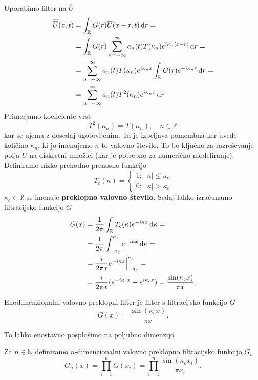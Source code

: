 \documentclass[mat2, tisk]{fmfdelo}
\newcommand{\R}{\mathbb R}
\newcommand{\N}{\mathbb N}
\newcommand{\Z}{\mathbb Z}
\begin{document}
\noindent
Uporabimo filter na $\overline{U}$
\begin{align*}
\overline{\overline{U}}(x, t) &= \int_\R G(r) \overline{U}(x-r, t) \dif r = \\
&= \int_\R G(r) \sum_{n=-\infty}^\infty a_n(t) T(\kappa_n) e^{i\kappa_n (x - r)} \dif r= \\
&= \sum_{n=-\infty}^\infty a_n(t)T(\kappa_n) e^{i\kappa_n x} \int_\R G(r)e^{-i\kappa_n r} \dif r = \\
&= \sum_{n=-\infty}^\infty a_n(t)T^2(\kappa_n) e^{i\kappa_n x} \dif r
\end{align*}
Primerjamo koeficiente vrst
$$
T^2(\kappa_n) = T(\kappa_n), \quad n\in \Z
$$
kar se ujema z dosedaj ugotovljenim. Ta je izpeljava pomembna ker uvede količino 
$\kappa_n$, ki jo imenujemo $n$-to valovno število. To bo ključno za razreševanje 
polja $\overline{U}$ na diskretni množici (kar je potrebno za numerično modeliranje).
Definiramo nizko-prehodno prenosno funkcijo
$$
T_c(\kappa)=\left\{\begin{array}{l}
  1 ;\,\, |\kappa| \leq \kappa_c \\
  0 ;\,\, |\kappa| > \kappa_c
\end{array}\right.
$$
$\kappa_c \in \R$ se imenuje \textbf{preklopno valovno število}. Sedaj lahko izračunamo 
filtracijsko funkcijo $G$
\begin{align*}
G(x) &= \frac{1}{2\pi} \int_\R T_c(\kappa) e^{-i\kappa x} \dif \kappa = \\
&= \frac{1}{2\pi} \int_{-\kappa_c}^{\kappa_c} e^{-i\kappa x} \dif \kappa = \\ 
&= \frac{i}{2\pi x} e^{-i\kappa x}\Big|_{-\kappa_c}^{\kappa_c} = \\
&= \frac{i}{2\pi x} (e^{-i\kappa_c x} - e^{i\kappa_c x}) = \frac{\sin(\kappa_c x)}{\pi x}.
\end{align*} 

\begin{definicija}
Enodimenzionalni valovno preklopni filter je filter s filtracijsko funkcijo $G$
\begin{equation}
G(x) = \frac{\sin(\kappa_c x)}{\pi x}.
\end{equation}
\end{definicija}
\noindent
To lahko enostavno posplošimo na poljubno dimenzijo 
\begin{definicija}
Za $n\in \N$ definiramo $n$-dimenzionalni valovno preklopno filtracijsko 
funkcijo $G_n$
\begin{equation}
G_n(x) = \prod_{i=1}^n G(x_i) =\prod_{i=1}^n \frac{\sin(\kappa_c x_i)}{\pi x_i}.
\end{equation} 
\end{definicija}
\end{document}
